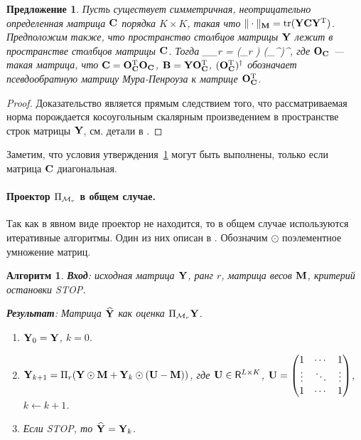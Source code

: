 \documentclass[12pt,a4paper,fleqn,leqno]{article}
\DeclareMathOperator{\tr}{tr}
\newtheorem{proposition}{Предложение}%
\newtheorem{algorithm}{Алгоритм}%
\begin{document}
\begin{proposition}
\label{prop:projS}
Пусть существует симметричная, неотрицательно определенная матрица  $\mathbf{C}$ порядка $K \times K$,
такая что $\|\cdot\|_\bfM = \tr(\bfY \bfC \bfY^\rmT)$.
Предположим также, что пространство столбцов матрицы $\mathbf{Y}$ лежит в пространстве столбцов матрицы $\mathbf{C}$.
Тогда
\be
\label{eq:PiMr}
\Pi_{\calM_r} \bfY = (\Pi_r \bfB) (\bfO_\bfC^{\rmT})^\dagger,
\ee
где $\mathbf{O}_{\mathbf{C}}$ --- такая матрица, что $\mathbf{C} = \mathbf{O}_{\mathbf{C}}^{\mathrm{T}}\mathbf{O}_{\mathbf{C}}$,
$\mathbf{B} = \mathbf{Y} \mathbf{O}_{\mathbf{C}}^{\mathrm{T}}$, $(\mathbf{O}_{\mathbf{C}}^{\mathrm{T}})^\dagger$ обозначает псевдообратную матрицу Мура-Пенроуза к матрице $\mathbf{O}_{\mathbf{C}}^{\mathrm{T}}$.
\end{proposition}
\begin{proof}
Доказательство является прямым следствием того, что рассматриваемая норма порождается косоугольным скалярным произведением в пространстве строк матрицы $\mathbf{Y}$, см. детали в \cite{Golyandina2013}.
\end{proof}

\begin{remark}
Заметим, что условия утверждения~\ref{prop:projS} могут быть выполнены, только если матрица $\mathbf{C}$ диагональная.
\end{remark}

\paragraph{Проектор $\Pi_{\mathcal{M}_r}$ в общем случае.}
Так как в явном виде проектор не находится, то в общем случае используются итеративные алгоритмы.
Один из них описан в \cite{Srebro2003}. Обозначим $\odot$ поэлементное умножение матриц.

\begin{algorithm}
\label{alg:weightedSVD}
\textbf{Вход}: исходная матрица $\mathbf{Y}$, ранг $r$, матрица весов $\mathbf{M}$,
критерий остановки STOP.

\textbf{Результат}:
Матрица $\widehat{\mathbf{Y}}$ как оценка $\Pi_{\mathcal{M}_r} \mathbf{Y}$.

\begin{enumerate}
\item
$\mathbf{Y}_0 = \mathbf{Y}$, $k=0$.
\item
$\mathbf{Y}_{k+1} = \Pi_r(\mathbf{Y} \odot \mathbf{M} + \mathbf{Y}_{k} \odot (\mathbf{U} -  \mathbf{M}))$, где
$\mathbf{U} \in \mathsf{R}^{L \times K}$,  $\mathbf{U} = \begin{pmatrix}
1 & \cdots & 1 \\
\vdots & \ddots & \vdots \\
1 & \cdots & 1
\end{pmatrix}$, $k\leftarrow k+1$.
\item
Если STOP, то $\widehat{\mathbf{Y}} = \mathbf{Y}_k$.
\end{enumerate}
\end{algorithm}
\end{document}
